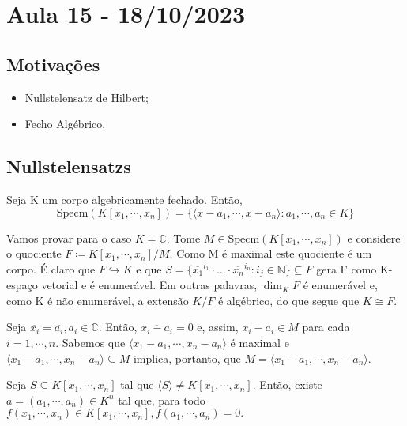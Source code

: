 \documentclass[AlgebraII/algebraII_notes.tex]{subfiles}
\begin{document}
\section{Aula 15 - 18/10/2023}
\subsection{Motivações}
\begin{itemize}
	\item Nullstelensatz de Hilbert;
	\item Fecho Algébrico.
\end{itemize}
\subsection{Nullstelensatzs}
\begin{theorem*}
	Seja K um corpo algebricamente fechado. Então,
	\[
		\mathrm{Specm}(K[x_{1}, \cdots, x_{n}]) = \{\langle x-a_{1}, \cdots, x-a_{n} \rangle: a_{1}, \cdots, a_{n}\in K\}
	\]
\end{theorem*}
\begin{proof*}
	Vamos provar para o caso \(K = \mathbb{C}.\) Tome \(M\in \mathrm{Specm}(K[x_{1}, \cdots, x_{n}])\) e considere o quociente \(F \coloneq K[x_{1}, \cdots, x_{n}]/M\). Como M é maximal
	este quociente é um corpo. É claro que \(F\hookrightarrow K\) e que \(S=\{\overline{x_{1}}^{i_{1}}\cdot \dotsc \cdot \overline{x_{n}}^{i_{n}}: i_{j}\in \mathbb{N}\} \subseteq{F}\)
	gera F como K-espaço vetorial e é enumerável. Em outras palavras, \(\dim_{K}F\) é enumerável e, como K é não enumerável, a extensão
	\(K/F\) é algébrico, do que segue que \(K\cong{F}.\)

	Seja \(\overline{x_{i}} = \overline{a_{i}}, a_{i}\in \mathbb{C}\). Então, \(\overline{x_{i} - a_{i}} = \overline{0}\) e, assim, \(x_{i}-a_{i}\in M\) para cada \(i=1, \cdots, n.\)
	Sabemos que \(\langle x_{1}-a_{1}, \cdots, x_{n}-a_{n} \rangle\) é maximal e \(\langle x_{1}-a_{1}, \cdots, x_{n}-a_{n} \rangle \subseteq{M}\) implica, portanto, que
	\(M = \langle x_{1}-a_{1}, \cdots, x_{n}-a_{n} \rangle\). \qedsymbol
\end{proof*}
\begin{theorem*}
	Seja \(S \subseteq{K[x_{1}, \cdots, x_{n}]}\) tal que \(\langle S \rangle\neq K[x_{1}, \cdots, x_{n}].\) Então, existe \(a=(a_{1}, \cdots, a_{n})\in K^{n}\)
	tal que, para todo \(f(x_{1}, \cdots, x_{n})\in K[x_{1}, \cdots, x_{n}], f(a_{1}, \cdots, a_{n}) = 0.\)
\end{theorem*}
\end{document}
